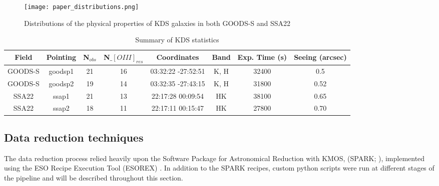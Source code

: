 \documentclass[a4paper,fleqn,usenatbib]{mn2e}
\begin{document}
\begin{figure}
\centering
\texttt{[image: paper\_distributions.png]}
\caption{Distributions of the physical properties of KDS galaxies in both GOODS-S and SSA22}
\label{fig:distributions}
\end{figure}

\begin{table*}\label{tab:pointings}
    \centering
\begin{tabular}{ c c c c c c c c }

 \hline
Field & Pointing & N$_{obs}$ & N$\_[OIII]_{res}$ & Coordinates & Band & Exp. Time (s) & Seeing (arcsec)  \\
 \hline
 GOODS-S & goodsp1 & 21 & 16 & 03:32:22 -27:52:51 & K, H & 32400 & 0.5 \\
GOODS-S & goodsp2 & 19 & 14 & 03:32:35 -27:43:15 & K, H & 31800 & 0.52 \\
SSA22 & ssap1 & 21 & 13 & 22:17:28 00:09:54 & HK & 38100 & 0.65 \\
SSA22 & ssap2 & 18 & 11 & 22:17:11 00:15:47 & HK & 27800 & 0.70 \\
 \hline
\end{tabular}
\caption{Summary of KDS statistics}
\end{table*}


\subsection{Data reduction techniques}\label{subsec:datareduction}
The data reduction process relied heavily upon the Software Package for Astronomical Reduction with KMOS, (SPARK; \cite{Davies2013}), implemented using the ESO Recipe Execution Tool (ESOREX) \citep{Freudling2013}.
In addition to the SPARK recipes, custom python scripts were run at different stages of the pipeline and will be described throughout this section.
\end{document}
